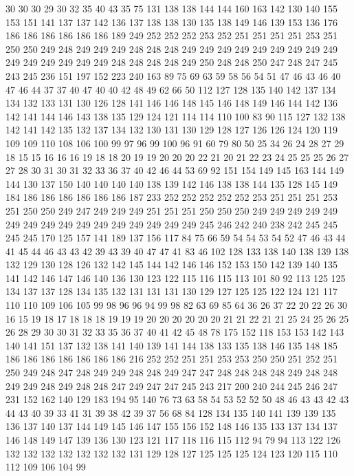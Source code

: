 30 30 30 29 30 32 35 40 43 35 75 131 138 138 144 144 160 163 142 130
140 155 153 151 141 137 137 142 136 137 138 138 130 135 138 149 146 139 153 136
176 186 186 186 186 186 186 189 249 252 252 252 253 252 251 251 251 251 253 251
250 250 249 248 249 249 249 248 248 248 249 249 249 249 249 249 249 249 249 249
249 249 249 249 249 248 248 248 248 249 250 248 248 250 247 248 247 245 243 245
236 151 197 152 223 240 163 89 75 69 63 59 58 56 54 51 47 46 43 46
40 47 46 44 37 37 40 47 40 40 42 48 49 62 66 50 112 127 128 135
140 142 137 134 134 132 133 131 130 126 128 141 146 146 148 145 146 148 149 146
144 142 136 142 141 144 146 143 138 135 129 124 121 114 114 110 100 83 90 115
127 132 138 142 141 142 135 132 137 134 132 130 131 130 129 128 127 126 126 124
120 119 109 109 110 108 106 100 99 97 96 99 100 96 91 60 79 80 50 25
34 26 24 28 27 29 18 15 15 16 16 16 19 18 18 20 19 19 20 20
20 22 21 20 21 22 23 24 25 25 25 26 27 27 28 30 31 30 31 32
33 36 37 40 42 46 44 53 69 92 151 154 149 145 163 144 149 144 130 137
150 140 140 140 140 138 139 142 146 138 138 144 135 128 145 149 184 186 186 186
186 186 186 187 233 252 252 252 252 252 253 251 251 251 253 251 250 250 249 247
249 249 249 251 251 251 250 250 250 249 249 249 249 249 249 249 249 249 249 249
249 249 249 249 249 245 246 242 240 238 242 245 245 245 245 170 125 157 141 189
137 156 117 84 75 66 59 54 54 53 54 52 47 46 43 44 41 45 44 46
43 43 42 39 43 39 40 47 47 41 83 46 102 128 133 138 140 138 139 138
132 129 130 128 126 132 142 145 144 142 146 146 152 153 150 142 139 140 135 141
142 146 147 146 140 136 130 123 122 115 116 115 113 101 80 92 113 125 125 134
137 137 128 134 135 132 131 131 131 130 129 127 125 125 122 124 121 117 110 110
109 106 105 99 98 96 96 94 99 98 82 63 69 85 64 36 26 37 22 20
22 26 30 16 15 19 18 17 18 18 18 19 19 19 20 20 20 20 20 20
21 21 22 21 21 25 24 25 26 25 26 28 29 30 30 31 32 33 35 36
37 40 41 42 45 48 78 175 152 118 153 153 142 143 140 141 151 137 132 138
141 140 139 141 144 138 133 135 138 146 135 148 185 186 186 186 186 186 186 186
216 252 252 251 251 253 253 250 250 251 252 251 250 249 248 247 248 249 249 248
248 249 247 247 248 248 248 248 249 248 248 249 249 248 249 248 248 247 249 247
247 245 243 217 200 240 244 245 246 247 231 152 162 140 129 183 194 95 140 76
73 63 58 54 53 52 52 50 48 46 43 43 42 43 44 43 40 39 33 41
31 39 38 42 39 37 56 68 84 128 134 135 140 141 139 139 135 136 137 140
137 144 149 145 146 147 155 156 152 148 146 135 133 137 134 137 146 148 149 147
139 136 130 123 121 117 118 116 115 112 94 79 94 113 122 126 132 132 132 132
132 132 132 131 129 128 127 125 125 125 124 123 120 115 110 112 109 106 104 99
